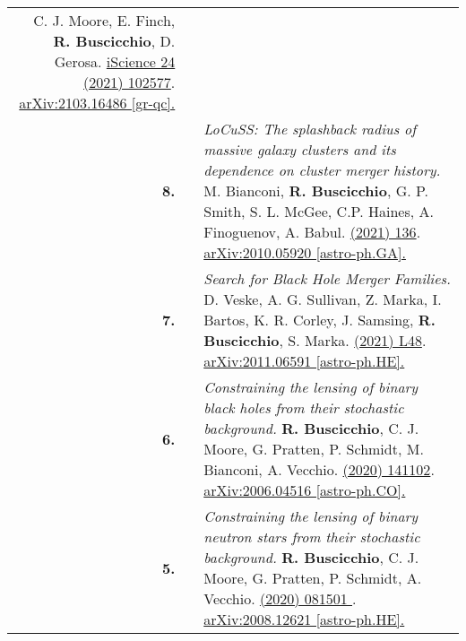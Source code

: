 {\begin{longtable}{rp{0.3cm}p{15.8cm}}
C. J. Moore, E. Finch, \textbf{R. Buscicchio}, D. Gerosa.
\newline{}
\href{https://www.sciencedirect.com/science/article/pii/S2589004221005459}{iScience 24 (2021) 102577}. \href{https://arxiv.org/abs/2103.16486}{arXiv:2103.16486   [gr-qc].}
\vspace{0.09cm}\\
%
\textbf{8.} & & \textit{LoCuSS: The splashback radius of massive galaxy clusters and its dependence on cluster merger history.}
\newline{}
M. Bianconi, \textbf{R. Buscicchio}, G. P. Smith, S. L. McGee, C.P. Haines, A. Finoguenov, A. Babul.
\newline{}
\href{https://iopscience.iop.org/article/10.3847/1538-4357/abebd7}{\apj 911 (2021) 136}. \href{https://arxiv.org/abs/2010.05920}{arXiv:2010.05920 [astro-ph.GA].}
\vspace{0.09cm}\\
%
\textbf{7.} & & \textit{Search for Black Hole Merger Families.}
\newline{}
D. Veske, A. G. Sullivan, Z. Marka, I. Bartos, K. R. Corley, J. Samsing, \textbf{R. Buscicchio}, S. Marka.
\newline{}
\href{https://iopscience.iop.org/article/10.3847/2041-8213/abd721}{\apjl 907 (2021) L48}. \href{https://arxiv.org/abs/2011.06591}{arXiv:2011.06591 [astro-ph.HE].}
\vspace{0.09cm}\\
%
\textbf{6.} & & \textit{Constraining the lensing of binary black holes from their stochastic background.}
\newline{}
\textbf{R. Buscicchio}, C. J. Moore, G. Pratten, P. Schmidt, M. Bianconi, A. Vecchio.
\newline{}
\href{https://journals.aps.org/prl/abstract/10.1103/PhysRevLett.125.141102}{\prl 125 (2020) 141102}. \href{https://arxiv.org/abs/2006.04516}{arXiv:2006.04516 [astro-ph.CO].}
\vspace{0.09cm}\\
%
\textbf{5.} & & \textit{Constraining the lensing of binary neutron stars from their stochastic background.}
\newline{}
\textbf{R. Buscicchio}, C. J. Moore, G. Pratten, P. Schmidt, A. Vecchio.
\newline{}
\href{https://journals.aps.org/prd/abstract/10.1103/PhysRevD.102.081501}{\prd 102 (2020) 081501 }. \href{https://arxiv.org/abs/2008.12621}{arXiv:2008.12621 [astro-ph.HE].}
\vspace{0.09cm}\\

\end{longtable}}
